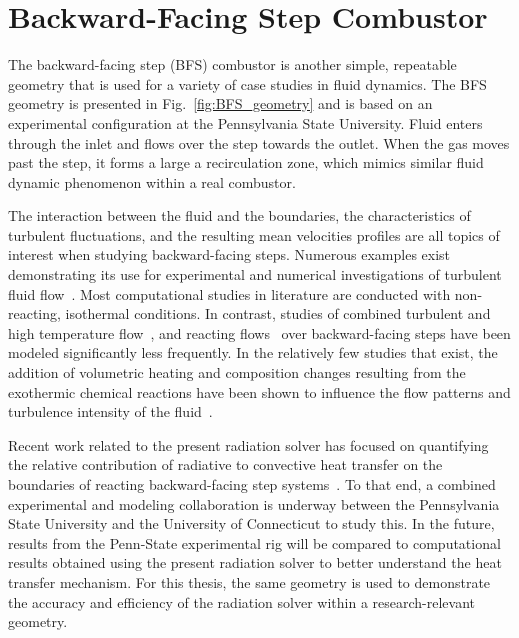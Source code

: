 \section{Backward-Facing Step Combustor}\label{section:BFS}
The backward-facing step (BFS) combustor is another simple, repeatable geometry that is used for a variety of case studies in fluid dynamics. 
The BFS geometry is presented in Fig.~\ref{fig:BFS_geometry} and is based on an experimental configuration at the Pennsylvania State University.
Fluid enters through the inlet and flows over the step towards the outlet. When the gas moves past the step, it forms a large a recirculation zone, which mimics similar fluid dynamic phenomenon within a real combustor. 

The interaction between the fluid and the boundaries, the characteristics of turbulent fluctuations, and the resulting mean velocities profiles are all topics of interest when studying backward-facing steps. 
Numerous examples exist demonstrating its use for experimental and numerical investigations of turbulent fluid flow~\cite{Armaly1983ExperimentalFlow,Neto1993AStep,Jovic1994Backward-facing5000,Le1997DirectStep}. 
Most computational studies in literature are conducted with non-reacting, isothermal conditions.
In contrast, studies of combined turbulent and high temperature flow~\cite{Niemann2016Buoyancy-affectedNumber,Xie2017GeometrySteps}, and reacting flows~\cite{Pouech2021PremixedStep} over backward-facing steps have been modeled significantly less frequently.
In the relatively few studies that exist, the addition of volumetric heating and composition changes resulting from the exothermic chemical reactions have been shown to influence the flow patterns and turbulence intensity of the fluid~\cite{Pouech2021PremixedStep}. 

Recent work related to the present radiation solver has focused on quantifying the relative contribution of radiative to convective heat transfer on the boundaries of reacting backward-facing step systems~\cite{Colborn2023VariationCombustor}.
To that end, a combined experimental and modeling collaboration is underway between the Pennsylvania State University and the University of Connecticut to study this. In the future, results from the Penn-State experimental rig will be compared to computational results obtained using the present radiation solver to better understand the heat transfer mechanism. For this thesis, the same geometry is used to demonstrate the accuracy and efficiency of the radiation solver within a research-relevant geometry.

